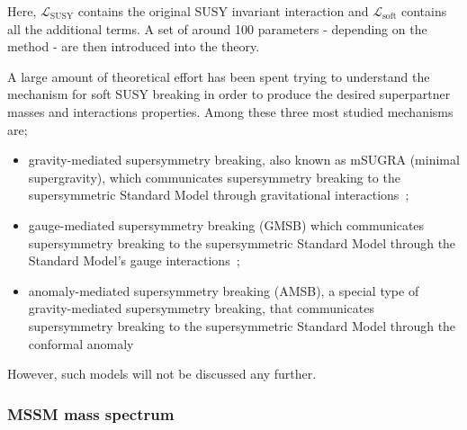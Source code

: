 				\noindent Here, $\mathcal {L_{\mathrm{SUSY}}}$ contains the original SUSY invariant interaction and $\mathcal {L_{\mathrm{soft}}}$ contains all the additional terms. A set of around 100 parameters - depending on the method - are then introduced into the theory.

				A large amount of theoretical effort has been spent trying to understand the mechanism for soft SUSY breaking in order to produce the desired superpartner masses and interactions properties. Among these three most studied mechanisms are; 

				\begin{itemize}
					\item gravity-mediated supersymmetry breaking, also known as mSUGRA (minimal supergravity), which communicates supersymmetry breaking to the supersymmetric Standard Model through gravitational interactions~\cite{PhysRevLett.49.970}; 
					\item gauge-mediated supersymmetry breaking (GMSB) which communicates supersymmetry breaking to the supersymmetric Standard Model through the Standard Model's gauge interactions~\cite{ARBEY2012162}; 
					\item anomaly-mediated supersymmetry breaking (AMSB), a special type of gravity-mediated supersymmetry breaking, that communicates supersymmetry breaking to the supersymmetric Standard Model through the conformal anomaly~\cite{Randall:1998uk, Giudice:1998xp}
				\end{itemize}

				\noindent However, such models will not be discussed any further.



			\subsubsection*{MSSM mass spectrum}




